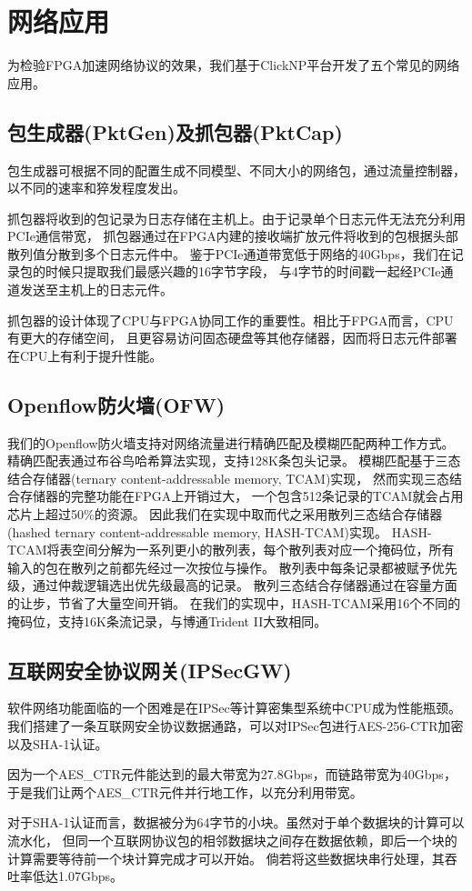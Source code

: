 \chapter{网络应用}
为检验FPGA加速网络协议的效果，我们基于ClickNP平台开发了五个常见的网络应用。

\section{包生成器(PktGen)及抓包器(PktCap)}
包生成器可根据不同的配置生成不同模型、不同大小的网络包，通过流量控制器，以不同的速率和猝发程度发出。

抓包器将收到的包记录为日志存储在主机上。由于记录单个日志元件无法充分利用PCIe通信带宽，
抓包器通过在FPGA内建的接收端扩放元件将收到的包根据头部散列值分散到多个日志元件中。
鉴于PCIe通道带宽低于网络的40Gbps，我们在记录包的时候只提取我们最感兴趣的16字节字段，
与4字节的时间戳一起经PCIe通道发送至主机上的日志元件。

抓包器的设计体现了CPU与FPGA协同工作的重要性。相比于FPGA而言，CPU有更大的存储空间，
且更容易访问固态硬盘等其他存储器，因而将日志元件部署在CPU上有利于提升性能。

\section{Openflow防火墙(OFW)}
我们的Openflow防火墙支持对网络流量进行精确匹配及模糊匹配两种工作方式。
精确匹配表通过布谷鸟哈希算法实现，支持128K条包头记录。
模糊匹配基于三态结合存储器(ternary content-addressable memory, TCAM)实现，
然而实现三态结合存储器的完整功能在FPGA上开销过大，
一个包含512条记录的TCAM就会占用芯片上超过50\%的资源。
因此我们在实现中取而代之采用散列三态结合存储器(hashed ternary content-addressable memory, HASH-TCAM)实现。
HASH-TCAM将表空间分解为一系列更小的散列表，每个散列表对应一个掩码位，所有输入的包在散列之前都先经过一次按位与操作。
散列表中每条记录都被赋予优先级，通过仲裁逻辑选出优先级最高的记录。
散列三态结合存储器通过在容量方面的让步，节省了大量空间开销。
在我们的实现中，HASH-TCAM采用16个不同的掩码位，支持16K条流记录，与博通Trident II大致相同。

\section{互联网安全协议网关(IPSecGW)}
软件网络功能面临的一个困难是在IPSec等计算密集型系统中CPU成为性能瓶颈。
我们搭建了一条互联网安全协议数据通路，可以对IPSec包进行AES-256-CTR加密以及SHA-1认证。

因为一个AES\_CTR元件能达到的最大带宽为27.8Gbps，而链路带宽为40Gbps，
于是我们让两个AES\_CTR元件并行地工作，以充分利用带宽。

对于SHA-1认证而言，数据被分为64字节的小块。虽然对于单个数据块的计算可以流水化，
但同一个互联网协议包的相邻数据块之间存在数据依赖，即后一个块的计算需要等待前一个块计算完成才可以开始。
倘若将这些数据块串行处理，其吞吐率低达1.07Gbps。
